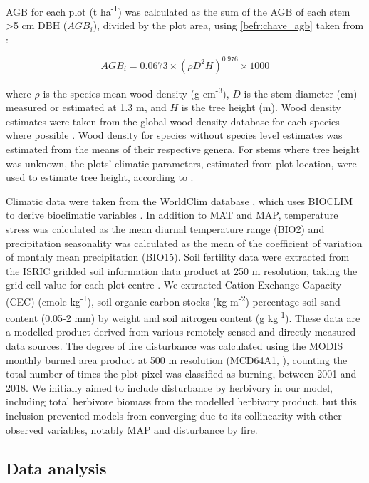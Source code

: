 \begin{refsection}
AGB for each plot (t ha\textsuperscript{-1}) was calculated as the sum of the AGB of each stem >5 cm DBH ($AGB_{i}$), divided by the plot area, using \autoref{befr:chave_agb} taken from \citet{Chave2014}:

\begin{equation}
	AGB_{i} = 0.0673 \times (\rho D^{2} H)^{0.976} \times 1000
	\label{befr:chave_agb}
\end{equation}

where $\rho$ is the species mean wood density (g cm\textsuperscript{-3}), $D$ is the stem diameter (cm) measured or estimated at 1.3 m, and $H$ is the tree height (m). Wood density estimates were taken from the global wood density database for each species where possible \citep{Chave2009, Zanne2009}. Wood density for species without species level estimates was estimated from the means of their respective genera. For stems where tree height was unknown, the plots' climatic parameters, estimated from plot location, were used to estimate tree height, according to \citet{Chave2014}.

Climatic data were taken from the WorldClim database \citep{Fick2017}, which uses BIOCLIM to derive bioclimatic variables \citep{Booth2014}. In addition to MAT and MAP, temperature stress was calculated as the mean diurnal temperature range (BIO2) and precipitation seasonality was calculated as the mean of the coefficient of variation of monthly mean precipitation (BIO15). Soil fertility data were extracted from the ISRIC gridded soil information data product at 250 m resolution, taking the grid cell value for each plot centre \citep{Hengl2017}. We extracted Cation Exchange Capacity (CEC) (cmolc kg\textsuperscript{-1}), soil organic carbon stocks (kg m\textsuperscript{-2}) percentage soil sand content (0.05-2 mm) by weight and soil nitrogen content (g kg\textsuperscript{-1}). These data are a modelled product derived from various remotely sensed and directly measured data sources. The degree of fire disturbance was calculated using the MODIS monthly burned area product at 500 m resolution (MCD64A1, \citealt{MCD64A1}), counting the total number of times the plot pixel was classified as burning, between 2001 and 2018. We initially aimed to include disturbance by herbivory in our model, including total herbivore biomass from the \citet{Hempson2017} modelled herbivory product, but this inclusion prevented models from converging due to its collinearity with other observed variables, notably MAP and disturbance by fire. 

\subsection{Data analysis}
\label{befr:ssec:analysis}


\end{refsection}
